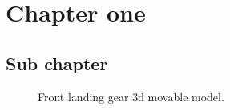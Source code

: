 \section{Chapter one}\label{cha:chapter_one}

\subsection{Sub chapter}\label{par:sub_chapter}


\begin{figure}[H]
\centering
{}
\caption{Front landing gear 3d movable model.}\label{3dm:awesome2}
\end{figure}